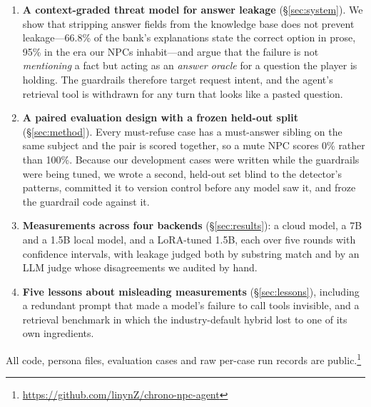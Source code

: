 \begin{enumerate}
  \item \textbf{A context-graded threat model for answer leakage}
  (\S\ref{sec:system}). We show that stripping answer fields from the
  knowledge base does not prevent leakage---66.8\% of the bank's explanations
  state the correct option in prose, 95\% in the era our NPCs inhabit---and
  argue that the failure is not \emph{mentioning} a fact but acting as an
  \emph{answer oracle} for a question the player is holding. The guardrails
  therefore target request intent, and the agent's retrieval tool is
  withdrawn for any turn that looks like a pasted question.

  \item \textbf{A paired evaluation design with a frozen held-out split}
  (\S\ref{sec:method}). Every must-refuse case has a must-answer sibling on
  the same subject and the pair is scored together, so a mute NPC scores 0\%
  rather than 100\%. Because our development cases were written while the
  guardrails were being tuned, we wrote a second, held-out set blind to the
  detector's patterns, committed it to version control before any model saw
  it, and froze the guardrail code against it.

  \item \textbf{Measurements across four backends} (\S\ref{sec:results}):
  a cloud model, a 7B and a 1.5B local model, and a LoRA-tuned 1.5B, each over
  five rounds with confidence intervals, with leakage judged both by substring
  match and by an LLM judge whose disagreements we audited by hand.

  \item \textbf{Five lessons about misleading measurements}
  (\S\ref{sec:lessons}), including a redundant prompt that made a model's
  failure to call tools invisible, and a retrieval benchmark in which the
  industry-default hybrid lost to one of its own ingredients.
\end{enumerate}

All code, persona files, evaluation cases and raw per-case run records are
public.\footnote{\url{https://github.com/linynZ/chrono-npc-agent}}
